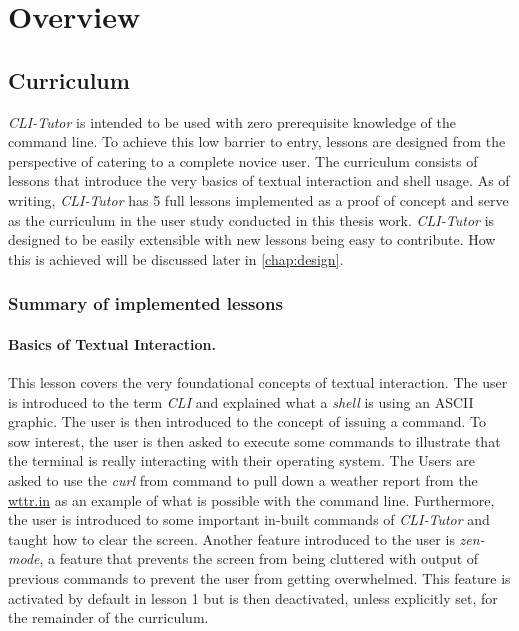 \section{Overview}
\subsection{Curriculum}

\textit{CLI-Tutor} is intended to be used with zero prerequisite knowledge of
the command line. To achieve this low barrier to entry, lessons are designed
from the perspective of catering to a complete novice user. The curriculum
consists of lessons that introduce the very basics of textual interaction and
shell usage. As of writing, \textit{CLI-Tutor} has 5 full lessons implemented
as a proof of concept and serve as the curriculum in the user study conducted
in this thesis work. \textit{CLI-Tutor} is designed to be easily extensible
with new lessons being easy to contribute. How this is achieved will be
discussed later in \autoref{chap:design}.

\subsubsection{Summary of implemented lessons}

\paragraph{Basics of Textual Interaction.} This lesson covers the very
foundational concepts of textual interaction. The user is introduced to the
term \textit{CLI} and explained what a \textit{shell} is using an ASCII
graphic. The user is then introduced to the concept of issuing a command. To
sow interest, the user is then asked to execute some commands to illustrate that
the terminal is really interacting with their operating system. The Users are
asked to use the \textit{curl} from command to pull down a weather report from
the \url{wttr.in} as an example of what is possible with the command line.
Furthermore, the user is introduced to some important in-built commands
of \textit{CLI-Tutor} and taught how to clear the screen. Another feature
introduced to the user is \textit{zen-mode}, a feature that prevents the screen
from being cluttered with output of previous commands to prevent the user from
getting overwhelmed. This feature is activated by default in lesson 1 but is
then deactivated, unless explicitly set, for the remainder of the curriculum.

